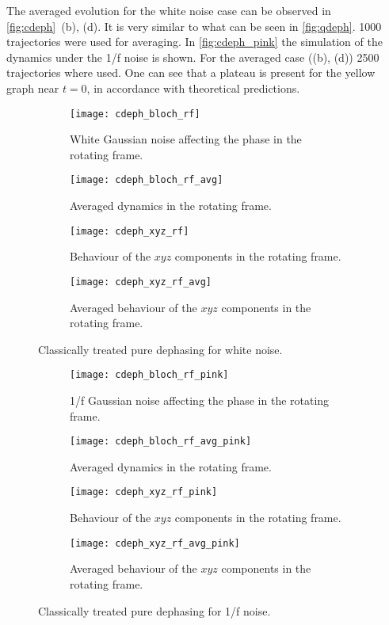 \documentclass[12pt, twoside]{report}
\numberwithin{equation}{section}
\begin{document}
The averaged evolution for the white noise case can be observed in \autoref{fig:cdeph}~(b), (d). It is very similar to what can be seen in \autoref{fig:qdeph}. 1000 trajectories were used for averaging.
In \autoref{fig:cdeph_pink} the simulation of the dynamics under the 1/f noise is shown. For the averaged case ((b), (d)) 2500 trajectories where used. One can see that a plateau is present for the yellow graph near $t=0$, in accordance with theoretical predictions.
\begin{figure}
\begingroup
\captionsetup[subfigure]{width=0.9\textwidth}
\centering
\begin{subfigure}[t]{0.45\textwidth}
\centering
\texttt{[image: cdeph\_bloch\_rf]}
\caption{White Gaussian noise affecting the phase in the rotating frame.}
\end{subfigure}
\begin{subfigure}[t]{0.45\textwidth}
\centering
\texttt{[image: cdeph\_bloch\_rf\_avg]}
\caption{Averaged dynamics in the rotating frame.}
\end{subfigure}

\begin{subfigure}[t]{0.45\textwidth}
\centering
\texttt{[image: cdeph\_xyz\_rf]}
\caption{Behaviour of the $xyz$ components in the rotating frame.}
\end{subfigure}
\begin{subfigure}[t]{0.45\textwidth}
\centering
\texttt{[image: cdeph\_xyz\_rf\_avg]}
\caption{Averaged behaviour of the $xyz$ components in the rotating frame.}
\end{subfigure}
\caption{Classically treated pure dephasing for white noise.}
\label{fig:cdeph}
\endgroup
\end{figure}

\begin{figure}
\begingroup
\captionsetup[subfigure]{width=0.9\textwidth}
\centering
\begin{subfigure}[t]{0.45\textwidth}
\centering
\texttt{[image: cdeph\_bloch\_rf\_pink]}
\caption{1/f Gaussian noise affecting the phase in the rotating frame.}
\end{subfigure}
\begin{subfigure}[t]{0.45\textwidth}
\centering
\texttt{[image: cdeph\_bloch\_rf\_avg\_pink]}
\caption{Averaged dynamics in the rotating frame.}
\end{subfigure}

\begin{subfigure}[t]{0.45\textwidth}
\centering
\texttt{[image: cdeph\_xyz\_rf\_pink]}
\caption{Behaviour of the $xyz$ components in the rotating frame.}
\end{subfigure}
\begin{subfigure}[t]{0.45\textwidth}
\centering
\texttt{[image: cdeph\_xyz\_rf\_avg\_pink]}
\caption{Averaged behaviour of the $xyz$ components in the rotating frame.}
\end{subfigure}
\caption{Classically treated pure dephasing for 1/f noise.}
\label{fig:cdeph_pink}
\endgroup
\end{figure}
\end{document}
